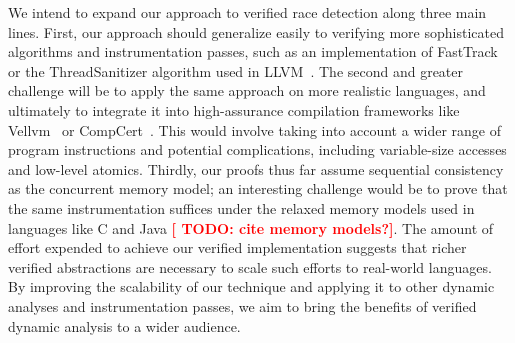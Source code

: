 \documentclass[preprint, 10pt]{sigplanconf}
\newcommand{\TODO}[1]{\textbf{\textcolor{red}{[ TODO: #1]}}}
\begin{document}
We intend to expand our approach to verified race detection along three main lines. First, our approach should generalize easily to verifying more sophisticated algorithms and instrumentation passes, such as an implementation of FastTrack~\cite{fasttrack} or the ThreadSanitizer algorithm used in LLVM~\cite{tsan}. The second and greater challenge will be to apply the same approach on more realistic languages, and ultimately to integrate it into high-assurance compilation frameworks like Vellvm~\cite{vellvm} or CompCert~\cite{compcert}. This would involve taking into account a wider range of program instructions and potential complications, including variable-size accesses and low-level atomics. Thirdly, our proofs thus far assume sequential consistency as the concurrent memory model; an interesting challenge would be to prove that the same instrumentation suffices under the relaxed memory models used in languages like C and Java \TODO{cite memory models?}. The amount of effort expended to achieve our verified implementation suggests that richer verified abstractions are necessary to scale such efforts to real-world languages. By improving the scalability of our technique and applying it to other dynamic analyses and instrumentation passes, we aim to bring the benefits of verified dynamic analysis to a wider audience.




\end{document}
